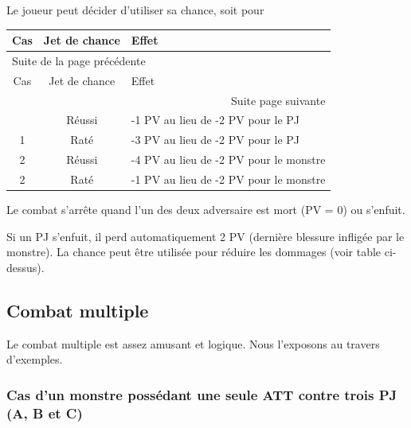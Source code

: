 \documentclass[a4paper, 11pt, twoside]{article}
\begin{document}
Le joueur peut décider d'utiliser sa chance, soit pour 

\begin{longtable}{c|c|l}
Cas & Jet de chance & Effet\\
\hline
\endfirsthead
\multicolumn{3}{l}{Suite de la page précédente} \\
\hline

Cas & Jet de chance & Effet \\

\hline
\endhead
\hline\multicolumn{3}{r}{Suite page suivante} \\
\endfoot
\endlastfoot
\hline
1 & Réussi & -1 PV au lieu de -2 PV pour le PJ\\
1 & Raté & -3 PV au lieu de -2 PV pour le PJ\\
\hline
2 & Réussi & -4 PV au lieu de -2 PV pour le monstre\\
2 & Raté & -1 PV au lieu de -2 PV pour le monstre\\
\end{longtable}

Le combat s'arrête quand l'un des deux adversaire est mort (PV = 0) ou s'enfuit.

Si un PJ s'enfuit, il perd automatiquement 2 PV (dernière blessure infligée par le monstre). La chance peut être utilisée pour réduire les dommages (voir table ci-dessus).

\subsection{Combat multiple}
\label{sec:orgb6b4886}

Le combat multiple est assez amusant et logique. Nous l'exposons au travers d'exemples.

\subsubsection{Cas d'un monstre possédant une seule ATT contre trois PJ (A, B et C)}
\label{sec:org82ac33b}
\end{document}
